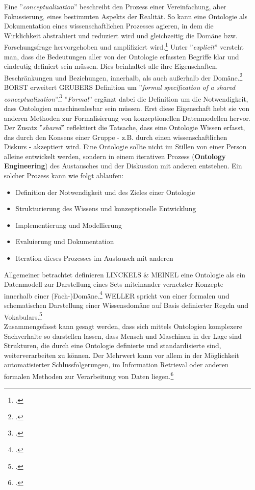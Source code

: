 \documentclass[12pt,a4paper]{article}
\begin{document}
Eine ''\textit{conceptualization}'' beschreibt den Prozess einer Vereinfachung, aber Fokussierung, eines bestimmten Aspekts der Realität. So kann eine Ontologie als Dokumentation eines wissenschaftlichen 
Prozesses agieren, in dem die Wirklichkeit abstrahiert und reduziert wird und gleichzeitig die Domäne bzw. Forschungsfrage hervorgehoben und amplifiziert wird.\footcite[Vgl.][]{thaller2017ungefahre}
Unter ''\textit{explicit}'' versteht man, dass die Bedeutungen aller von der Ontologie erfassten Begriffe klar und eindeutig definiert sein müssen. Dies beinhaltet alle ihre Eigenschaften, Beschränkungen und Beziehungen, innerhalb, als auch außerhalb der Domäne.\footcite{sure2003methodology}
BORST erweitert GRUBERS Definition um  ''\textit{formal specification of a shared  conceptualization}''.\footcite{borst1997construction}
''\textit{Formal}'' ergänzt dabei die Definition um die Notwendigkeit, dass Ontologien maschinenlesbar sein müssen. Erst diese Eigenschaft hebt sie von anderen Methoden zur Formalisierung von konzeptionellen Datenmodellen hervor. Der Zusatz ''\textit{shared}'' reflektiert die Tatsache, dass eine Ontologie Wissen erfasst, das durch den Konsens einer Gruppe - z.B. durch einen wissenschaftlichen Diskurs - akzeptiert wird. Eine Ontologie sollte nicht im Stillen von einer Person alleine entwickelt werden, sondern in einem iterativen Prozess (\textbf{Ontology Engineering}) des Austausches und der Diskussion mit anderen entstehen. Ein solcher Prozess kann wie folgt ablaufen:
\begin{itemize}
\item Definition der Notwendigkeit und des Zieles einer Ontologie
\item Strukturierung des Wissens und konzeptionelle Entwicklung
\item Implementierung und Modellierung
\item Evaluierung und Dokumentation
\item Iteration dieses Prozesses im Austausch mit anderen
\end{itemize}
Allgemeiner betrachtet definieren LINCKELS \& MEINEL eine Ontologie als ein Datenmodell zur Darstellung eines Sets miteinander vernetzter Konzepte innerhalb einer (Fach-)Domäne.\footcite{linckels2011librarian} WELLER spricht von einer formalen und schematischen Darstellung einer Wissensdomäne auf Basis definierter Regeln und Vokabulars.\footcite{weller2013InformationBand}
\\ 
Zusammengefasst kann gesagt werden, dass sich mittels Ontologien komplexere Sachverhalte so darstellen lassen, dass Mensch und Maschinen in der Lage sind Strukturen, die durch eine Ontologie definierte und standardisierte sind, weiterverarbeiten zu können. Der Mehrwert kann vor allem in der Möglichkeit automatisierter Schlussfolgerungen, im Information Retrieval oder anderen formalen Methoden zur Verarbeitung von Daten liegen.\footcite[Vgl][S.162-178]{jannidis2017digital} 
\end{document}
